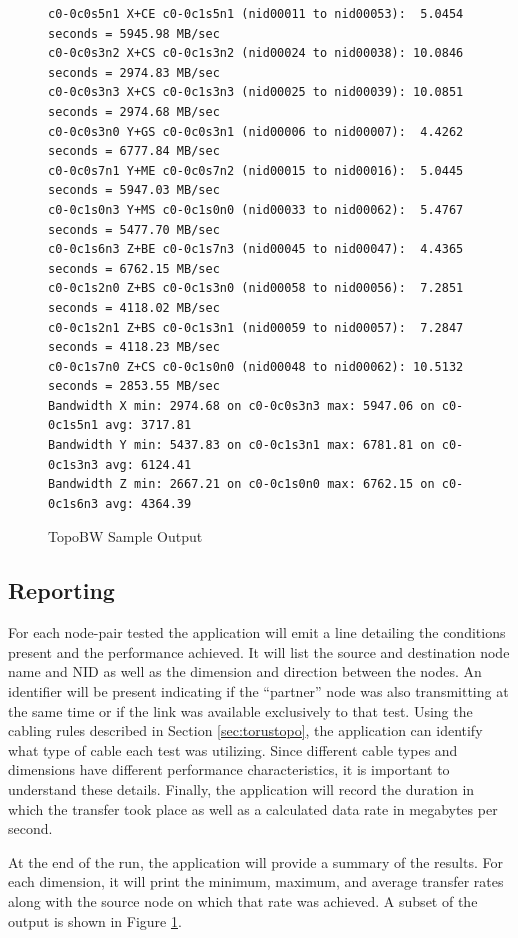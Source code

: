 \documentclass[10pt, conference, compsocconf]{IEEEtran}
\begin{document}
\begin{figure}[ht]
  \begin{verbatim}
c0-0c0s5n1 X+CE c0-0c1s5n1 (nid00011 to nid00053):  5.0454 seconds = 5945.98 MB/sec
c0-0c0s3n2 X+CS c0-0c1s3n2 (nid00024 to nid00038): 10.0846 seconds = 2974.83 MB/sec
c0-0c0s3n3 X+CS c0-0c1s3n3 (nid00025 to nid00039): 10.0851 seconds = 2974.68 MB/sec
c0-0c0s3n0 Y+GS c0-0c0s3n1 (nid00006 to nid00007):  4.4262 seconds = 6777.84 MB/sec
c0-0c0s7n1 Y+ME c0-0c0s7n2 (nid00015 to nid00016):  5.0445 seconds = 5947.03 MB/sec
c0-0c1s0n3 Y+MS c0-0c1s0n0 (nid00033 to nid00062):  5.4767 seconds = 5477.70 MB/sec
c0-0c1s6n3 Z+BE c0-0c1s7n3 (nid00045 to nid00047):  4.4365 seconds = 6762.15 MB/sec
c0-0c1s2n0 Z+BS c0-0c1s3n0 (nid00058 to nid00056):  7.2851 seconds = 4118.02 MB/sec
c0-0c1s2n1 Z+BS c0-0c1s3n1 (nid00059 to nid00057):  7.2847 seconds = 4118.23 MB/sec
c0-0c1s7n0 Z+CS c0-0c1s0n0 (nid00048 to nid00062): 10.5132 seconds = 2853.55 MB/sec
Bandwidth X min: 2974.68 on c0-0c0s3n3 max: 5947.06 on c0-0c1s5n1 avg: 3717.81
Bandwidth Y min: 5437.83 on c0-0c1s3n1 max: 6781.81 on c0-0c1s3n3 avg: 6124.41
Bandwidth Z min: 2667.21 on c0-0c1s0n0 max: 6762.15 on c0-0c1s6n3 avg: 4364.39
  \end{verbatim}
  \caption{TopoBW Sample Output}\label{fig:topobwresults}
\end{figure}

\subsection{Reporting}

For each node-pair tested the application will emit a line detailing the
conditions present and the performance achieved.  It will list the source and
destination node name and NID as well as the dimension and direction between
the nodes.  An identifier will be present indicating if the ``partner'' node
was also transmitting at the same time or if the link was available exclusively
to that test.  Using the cabling rules described in Section
\ref{sec:torustopo}, the application can identify what type of cable each test
was utilizing.  Since different cable types and dimensions have different
performance characteristics, it is important to understand these details.
Finally, the application will record the duration in which the transfer took
place as well as a calculated data rate in megabytes per second.

At the end of the run, the application will provide a summary of the results.
For each dimension, it will print the minimum, maximum, and average transfer
rates along with the source node on which that rate was achieved.  A subset of
the output is shown in Figure \ref{fig:topobwresults}.
\end{document}
